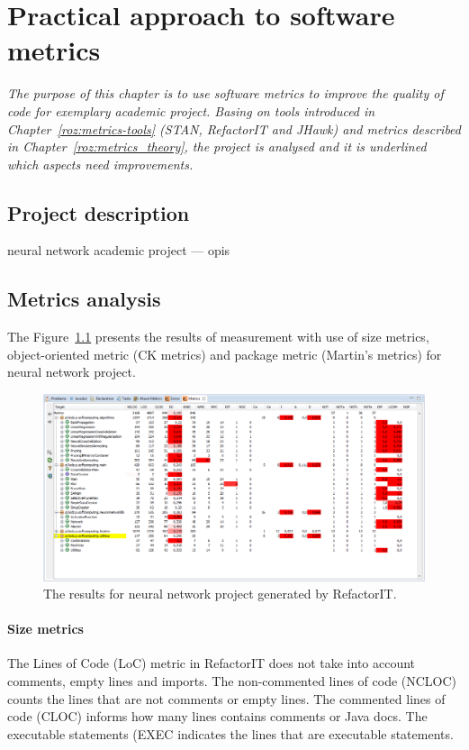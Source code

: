 \chapter{Practical approach to software metrics} \label{roz:metrics-practic}

\textit{The purpose of this chapter is to use software metrics to improve the quality of code for exemplary academic project. Basing on tools introduced in Chapter~\ref{roz:metrics-tools} (STAN, RefactorIT and JHawk) and metrics described in Chapter~\ref{roz:metrics_theory}, the project is analysed and it is underlined which aspects need improvements.}

\section{Project description}
neural network academic project --- opis

\section{Metrics analysis}
The Figure~\ref{fig:wyniki} presents the results of measurement with use of size metrics, object-oriented metric (\ac{CK metrics}) and package metric (Martin's metrics) for neural network project.  

\begin{figure}[h!]
	\centering
	\includegraphics[scale=0.45]{img/wyniki-refactorIT.png} 
	\caption{The results for neural network project generated by RefactorIT.}		
	\label{fig:wyniki}
\end{figure}

\subsubsection*{Size metrics}
The Lines of Code (\ac{LoC}) metric in RefactorIT does not take into account comments, empty lines and imports. The non-commented lines of code (\ac{NCLOC}) counts the lines that are not comments or empty lines. The commented lines of code (\ac{CLOC}) informs how many lines contains comments or Java docs. The executable statements (\ac{EXEC} indicates the lines that are executable statements. 

